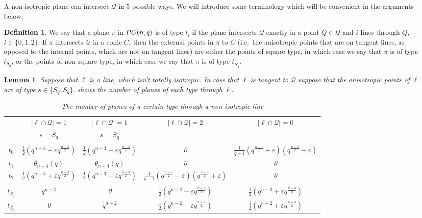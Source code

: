 \documentclass[a4paper]{article}
\newtheorem{lm}[thm]{Lemma}
\theoremstyle{definition}
\newtheorem{df}[thm]{Definition}
\newcommand{\eps}{\varepsilon}
\newcommand{\pg}{\textnormal{PG}}
\newcommand{\mq}{\mathcal Q}
\newcommand{\ns}{\overline S}
\begin{document}
A non-isotropic plane can intersect $\mq$ in 5 possible ways.
We will introduce some terminology which will be convenient in the arguments below.

\begin{df}
 We say that a plane $\pi$ in $\pg(n,q)$ is of type $t_i$ if the plane intersects $\mq$ exactly in a point $Q \in \mq$ and $i$ lines through $Q$, $i \in \{0,1,2\}$.
 If $\pi$ intersects $\mq$ in a conic $C$, then the external points in $\pi$ to $C$ (i.e.~the anisotropic points that are on tangent lines, as opposed to the internal points, which are not on tangent lines) are either the points of square type, in which case we say that $\pi$ is of type $t_{S_q}$, or the points of non-square type, in which case we say that $\pi$ is of type $t_{\ns_q}$.
\end{df}

\begin{lm}
 \label{LmPlanesThroughLines}
 Suppose that $\ell$ is a line, which isn't totally isotropic.
 In case that $\ell$ is tangent to $\mq$ suppose that the anisotropic points of $\ell$ are of type $s \in \{S_q, \ns_q\}$.
  shows the number of planes of each type through $\ell$.
 \begin{table}[ht!]
  \small
  \centering
  \begin{tabular}{c|| c c c c}
   & $|\ell \cap \mq| = 1$ & $|\ell \cap \mq| = 1$ & $|\ell \cap \mq| = 2$ & $|\ell \cap \mq| = 0$\\
   & $s=S_q$ & $s=\ns_q$ \\ \hline \hline \\ [-1em]
   $t_0$ & $\frac{1}{2}\left(q^{n-3}-\varepsilon q^{\frac{n-3}{2}}\right)$ & $\frac{1}{2}\left(q^{n-3}-\varepsilon q^{\frac{n-3}{2}}\right)$ & 0 & $\frac 1 {q-1} \left( q^{\frac{n-1}2} + \eps \right)\left( q^{\frac{n-3}2} - \eps \right)$ \\
   $t_1$ & $\theta_{n-4}(q)$ & $\theta_{n-4}(q)$ & 0 & 0 \\
   $t_2$ & $\frac{1}{2}\left(q^{n-3}+\varepsilon q^{\frac{n-3}{2}}\right)$ & $\frac{1}{2}\left(q^{n-3}+\varepsilon q^{\frac{n-3}{2}}\right)$ & $\frac 1 {q-1} \left( q^{\frac{n-1}2} - \eps \right)\left( q^{\frac{n-3}2} + \eps \right)$ & 0 \\ [1em] \hline \\ [-1em]
   $t_{S_q}$ & $q^{n-2}$ & 0 & $\frac{1}{2}\left(q^{n-2}-\eps q^{\frac{n-3}{2}}\right)$ & $\frac{1}{2}\left(q^{n-2}+\eps q^{\frac{n-3}{2}}\right)$ \\
   $t_{\ns_q}$ & 0 & $q^{n-2}$ & $\frac{1}{2}\left(q^{n-2}-\eps q^{\frac{n-3}{2}}\right)$ & $\frac{1}{2}\left(q^{n-2}+\eps q^{\frac{n-3}{2}}\right)$
  \end{tabular}
  \caption{The number of planes of a certain type through a non-isotropic line}
  \label{TabPlanesThroughLines}
 \end{table}
\end{lm}
\end{document}
